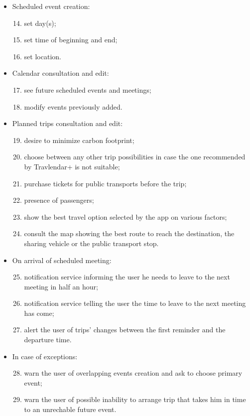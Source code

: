 \begin{itemize}
\item	Scheduled event creation: 
\begin{enumerate}
  \setcounter{enumi}{13}
\item set day(s);
\item set time of beginning and end;
\item set location.
\end{enumerate}

\item	Calendar consultation and edit:
\begin{enumerate}
  \setcounter{enumi}{16}
\item see future scheduled events and meetings;
\item modify events previously added.
\end{enumerate}


\item	Planned trips consultation and edit:
\begin{enumerate}
  \setcounter{enumi}{18}
\item	desire to minimize carbon footprint;
\item	choose between any other trip possibilities in case the one recommended by Travlendar+ is not suitable;
\item	purchase tickets for public transports before the trip;
\item	presence of passengers;
\item	show the best travel option selected by the app on various factors;
\item	consult the map showing the best route to reach the destination, the sharing vehicle or the public transport stop.
\end{enumerate}

\item	On arrival of scheduled meeting:
\begin{enumerate}
  \setcounter{enumi}{24}
\item	notification service informing the user he needs to leave to the next meeting in half an hour;
\item	notification service telling the user the time to leave to the next meeting has come;
\item	alert the user of trips’ changes between the first reminder and the departure time.
\end{enumerate}

\item	In case of exceptions:
\begin{enumerate}
  \setcounter{enumi}{27}
\item	warn the user of overlapping events creation and ask to choose primary event;
\item	warn the user of possible inability to arrange trip that takes him in time to an unrechable future event.
\end{enumerate}


\end{itemize}
